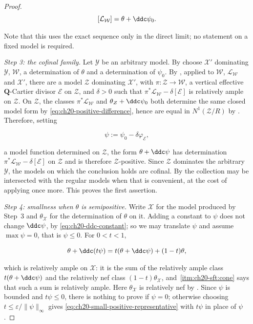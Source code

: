\begin{proof}
\begin{equation}
\label{eq:ch20-positive-difference}
             [\mathcal L_{\mathcal W}]=\theta+\ddc\psi_0 .
\end{equation}

Note that this uses the exact sequence only in the direct limit; no
statement on a fixed model is required.

\emph{Step 3: the cofinal family.}  Let $\mathcal Y$ be an arbitrary
model.  By  choose $\mathcal X'$ dominating
$\mathcal Y$, $\mathcal W$, a determination of $\theta$ and a
determination of $\psi_0$.  By , applied
to $\mathcal W$, $\mathcal L_{\mathcal W}$ and $\mathcal X'$, there
are a model $\mathcal Z$ dominating $\mathcal X'$, with
$\pi:\mathcal Z\to\mathcal W$, a vertical effective
$\mathbf Q$-Cartier divisor $\mathcal E$ on $\mathcal Z$, and
$\delta>0$ such that
$\pi^*\mathcal L_{\mathcal W}-\delta[\mathcal E]$ is relatively ample on
$\mathcal Z$.  On $\mathcal Z$, the classes
$\pi^*\mathcal L_{\mathcal W}$ and $\theta_{\mathcal Z}+\ddc\psi_0$ both
determine the same closed model form by
\eqref{eq:ch20-positive-difference}, hence are equal in
$N^1(\mathcal Z/R)$ by .  Therefore, setting

\[
 \psi:=\psi_0-\delta\varphi_{\mathcal E},
\]

a model function determined on $\mathcal Z$, the form $\theta+\ddc\psi$
has determination $\pi^*\mathcal L_{\mathcal W}-\delta[\mathcal E]$ on
$\mathcal Z$ and is therefore $\mathcal Z$-positive.  Since
$\mathcal Z$ dominates the arbitrary $\mathcal Y$, the models on which
the conclusion holds are cofinal.  By  the collection
may be intersected with the regular models when that is convenient, at the
cost of applying
 once more.  This proves the first
assertion.

\emph{Step 4: smallness when $\theta$ is semipositive.}  Write
$\mathcal X$ for the model produced by Step~3 and $\theta_{\mathcal X}$
for the determination of $\theta$ on it.  Adding a constant
to $\psi$ does not change $\ddc\psi$, by
\eqref{eq:ch20-ddc-constant}; so we may translate $\psi$ and assume
$\max\psi=0$, that is $\psi\leq0$.  For $0<t<1$,

\begin{equation}
\label{eq:ch20-positive-convex-combination}
 \theta+\ddc(t\psi)
 =t(\theta+\ddc\psi)+(1-t)\theta ,
\end{equation}

which is relatively ample on $\mathcal X$: it is the sum of the relatively
ample class $t(\theta+\ddc\psi)$ and the relatively nef class
$(1-t)\theta_{\mathcal X}$, and
\,\cref{itm:ch20-sft:cone} says that such a
sum is relatively ample.  Here $\theta_{\mathcal X}$ is relatively nef by
.
Since $\psi$ is bounded and $t\psi\leq0$, there is nothing to prove if
$\psi=0$; otherwise choosing
$t\leq\varepsilon/\|\psi\|_\infty$ gives
\eqref{eq:ch20-small-positive-representative} with $t\psi$ in place of
$\psi$.
\end{proof}

